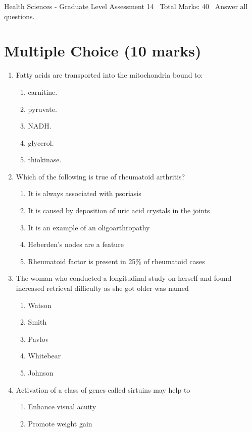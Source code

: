 \documentclass[12pt]{article}
\begin{document}
\begin{center}
Health Sciences - Graduate Level Assessment 14 \
Total Marks: 40 \
Answer all questions.
\end{center}

\section*{Multiple Choice (10 marks)}
\begin{enumerate}[label=\arabic*.]
\item Fatty acids are transported into the mitochondria bound to:
\begin{enumerate}[label=(\alph*)]
    \item carnitine.
    \item pyruvate.
    \item NADH.
    \item glycerol.
    \item thiokinase.
\end{enumerate}
\item Which of the following is true of rheumatoid arthritis?
\begin{enumerate}[label=(\alph*)]
    \item It is always associated with psoriasis
    \item It is caused by deposition of uric acid crystals in the joints
    \item It is an example of an oligoarthropathy
    \item Heberden's nodes are a feature
    \item Rheumatoid factor is present in 25\% of rheumatoid cases
\end{enumerate}
\item The woman who conducted a longitudinal study on herself and found increased retrieval difficulty as she got older was named
\begin{enumerate}[label=(\alph*)]
    \item Watson
    \item Smith
    \item Pavlov
    \item Whitebear
    \item Johnson
\end{enumerate}
\item Activation of a class of genes called sirtuins may help to
\begin{enumerate}[label=(\alph*)]
    \item Enhance visual acuity
    \item Promote weight gain

\end{enumerate}
\end{enumerate}
\end{document}
